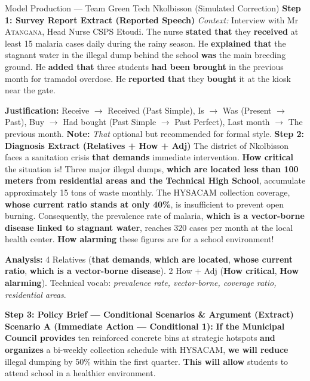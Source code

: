 \documentclass[11pt]{article}
\newcommand{\cle}[1]{{\popxbold\color{popdark}#1}}
\begin{document}
\begin{exoresolu}{Model Production — Team \og Green Tech Nkolbisson \fg{} (Simulated Correction)}
\textbf{Step 1: Survey Report Extract (Reported Speech)}
\textit{Context:} Interview with Mr \textsc{Atangana}, Head Nurse CSPS Etoudi.
The nurse \textbf{stated that} they \textbf{received} at least 15 malaria cases daily during the rainy season. He \textbf{explained that} the stagnant water in the illegal dump behind the school \textbf{was} the main breeding ground. He \textbf{added that} three students \textbf{had been brought} in the previous month for tramadol overdose. He \textbf{reported that} they \textbf{bought} it at the kiosk near the gate.
\par \textbf{Justification:} \cle{Receive $\to$ Received} (Past Simple), \cle{Is $\to$ Was} (Present $\to$ Past), \cle{Buy $\to$ Had bought} (Past Simple $\to$ Past Perfect), \cle{Last month $\to$ The previous month}. \textbf{Note:} \emph{That} optional but recommended for formal style.
\tcblower
\textbf{Step 2: Diagnosis Extract (Relatives + How + Adj)}
The district of Nkolbisson faces a sanitation crisis \textbf{that demands} immediate intervention. \textbf{How critical} the situation is! Three major illegal dumps, \textbf{which are located less than 100 meters from residential areas and the Technical High School}, accumulate approximately 15 tons of waste monthly. The HYSACAM collection coverage, \textbf{whose current ratio stands at only 40\%}, is insufficient to prevent open burning. Consequently, the prevalence rate of malaria, \textbf{which is a vector-borne disease linked to stagnant water}, reaches 320 cases per month at the local health center. \textbf{How alarming} these figures are for a school environment!
\par \textbf{Analysis:} 4 Relatives (\textbf{that demands}, \textbf{which are located}, \textbf{whose current ratio}, \textbf{which is a vector-borne disease}). 2 \cle{How + Adj} (\textbf{How critical}, \textbf{How alarming}). Technical vocab: \emph{prevalence rate, vector-borne, coverage ratio, residential areas}.

\textbf{Step 3: Policy Brief — Conditional Scenarios \& Argument (Extract)}
\textbf{Scenario A (Immediate Action — Conditional 1):}
\textbf{If the Municipal Council provides} ten reinforced concrete bins at strategic hotspots \textbf{and organizes} a bi-weekly collection schedule with HYSACAM, \textbf{we will reduce} illegal dumping by 50\% within the first quarter. \textbf{This will allow} students to attend school in a healthier environment.


\end{exoresolu}
\end{document}
